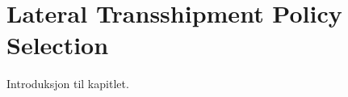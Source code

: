 \documentclass[../../main.tex]{subfiles}
\begin{document}

\section{Lateral Transshipment Policy Selection}

Introduksjon til kapitlet.

\end{document}
